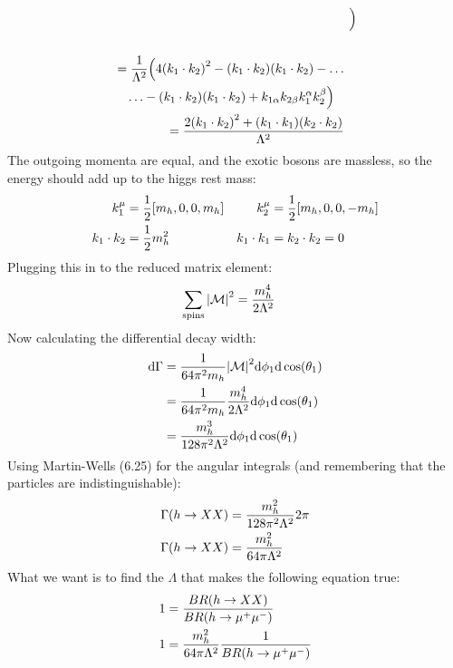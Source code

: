 \documentclass[12 pt,draft]{article}
\begin{document}
\begin{problem}
\begin{align}
\begin{split}
				\Big)
			\end{split}
			\\
			\begin{split}
				\\
				&=\oo{\Lambda^2}
				\Big(
					4\qty(k_1 \cdot k_2)^2
					-\qty(k_1 \cdot k_2)\qty(k_1\cdot k_2)
					-\ldots\\&\quad\ldots
					-\qty(k_1\cdot k_2)\qty(k_1 \cdot k_2)
					+k_{1\alpha}k_{2\beta}k_{1}^{\alpha}k_{2}^{\beta}
				\Big)
			\end{split}
			\\
			\begin{split}
				&=\oo[2\qty(k_1 \cdot k_2)^2+(k_1\cdot k_1)(k_2\cdot k_2)]{\Lambda^2}
			\end{split}
		\end{align}
		The outgoing momenta are equal, and the exotic bosons are massless, so the energy should add up to the higgs rest mass:
		\begin{align}
			k_1^\mu&=\oo{2}[m_h,0,0,m_h]
			&
			k_2^\mu&=\oo{2}[m_h,0,0,-m_h]
			\\
			k_1\cdot k_2&=\oo{2}m_h^2
			&
			k_1\cdot k_1&=k_2\cdot k_2=0
		\end{align}
		Plugging this in to the reduced matrix element:
		\begin{align}
			\sum_\text{spins}\qty|\mathcal{M}|^2
			&=\oo[m_h^4]{2\Lambda^2}
		\end{align}
		Now calculating the differential decay width:
		\begin{align}
			\d\Gamma&=\oo{64\pi^2m_h}\qty|\mathcal{M}|^2
			\d\phi_1\d\cos(\theta_1)
			\\
			&=\oo{64\pi^2m_h}\oo[m_h^4]{2\Lambda^2}
			\d\phi_1\d\cos(\theta_1)
			\\
			&=\oo[m_h^3]{128\pi^2\Lambda^2}
			\d\phi_1\d\cos(\theta_1)
		\end{align}
		Using Martin-Wells (6.25) for the angular integrals (and remembering that the particles are indistinguishable):
		\begin{align}
			\Gamma(h\rightarrow XX)&=\oo[m_h^2]{128\pi^2\Lambda^2}
			2\pi
			\\
			\Gamma(h\rightarrow XX)&=\oo[m_h^2]{64\pi\Lambda^2}
		\end{align}
		What we want is to find the $\Lambda$ that makes the following equation true:
		\begin{align}
			1&=\frac{BR(h\rightarrow XX)}{BR(h\rightarrow \mu^+\mu^-)}
			\\
			1&=\oo[m_h^2]{64\pi\Lambda^2}\oo{BR(h\rightarrow \mu^+\mu^-)}

\end{align}
\end{problem}
\end{document}
